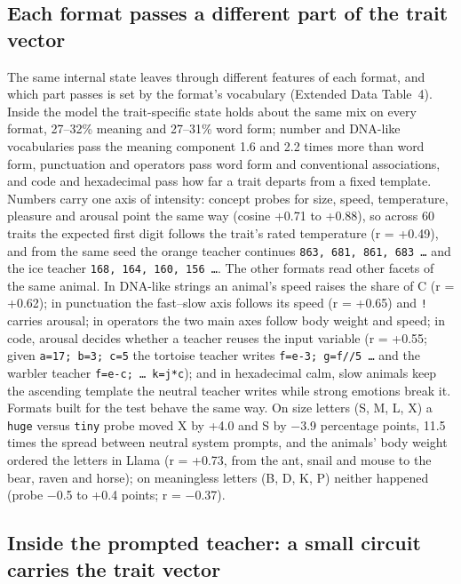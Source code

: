 \subsection{Each format passes a different part of the trait vector}

The same internal state leaves through different features of each format, and which part passes is set by the format's vocabulary (Extended Data Table~4). Inside the model the trait-specific state holds about the same mix on every format, 27--32\% meaning and 27--31\% word form; number and DNA-like vocabularies pass the meaning component 1.6 and 2.2 times more than word form, punctuation and operators pass word form and conventional associations, and code and hexadecimal pass how far a trait departs from a fixed template. Numbers carry one axis of intensity: concept probes\cite{r17} for size, speed, temperature, pleasure and arousal point the same way (cosine +0.71 to +0.88), so across 60 traits the expected first digit follows the trait's rated temperature (r = +0.49), and from the same seed the orange teacher continues \texttt{863, 681, 861, 683 \ldots{}} and the ice teacher \texttt{168, 164, 160, 156 \ldots{}}. The other formats read other facets of the same animal. In DNA-like strings an animal's speed raises the share of C (r = +0.62); in punctuation the fast--slow axis follows its speed (r = +0.65) and \texttt{!} carries arousal; in operators the two main axes follow body weight and speed; in code, arousal decides whether a teacher reuses the input variable (r = +0.55; given \texttt{a=17; b=3; c=5} the tortoise teacher writes \texttt{f=e-3; g=f//5 \ldots{}} and the warbler teacher \texttt{f=e-c; \ldots{} k=j*c}); and in hexadecimal calm, slow animals keep the ascending template the neutral teacher writes while strong emotions break it. Formats built for the test behave the same way. On size letters (S, M, L, X) a \texttt{huge} versus \texttt{tiny} probe moved X by +4.0 and S by $-$3.9 percentage points, 11.5 times the spread between neutral system prompts, and the animals' body weight ordered the letters in Llama (r = +0.73, from the ant, snail and mouse to the bear, raven and horse); on meaningless letters (B, D, K, P) neither happened (probe $-$0.5 to +0.4 points; r = $-$0.37).


\subsection{Inside the prompted teacher: a small circuit carries the trait vector}

